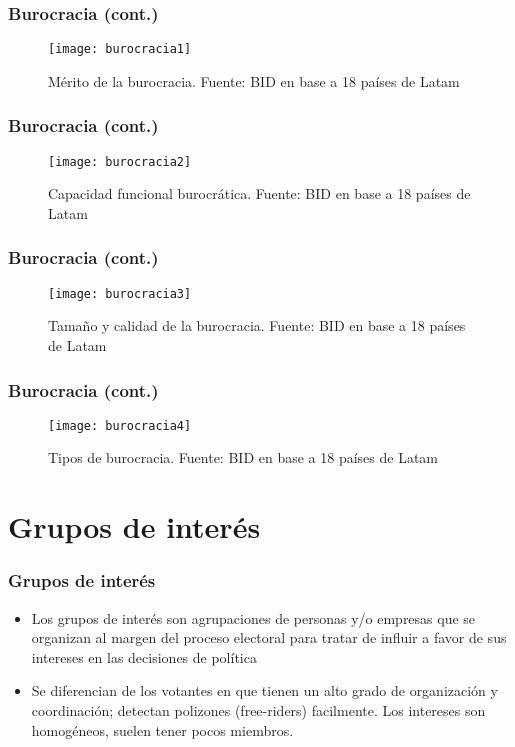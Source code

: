 \documentclass[14pt,aspectratio=169]{beamer}
\begin{document}
\begin{frame}\frametitle{Burocracia (cont.)}
 \begin{figure}[htbp]\vspace{0cm}
    \centering
    \texttt{[image: burocracia1]}
    \caption{Mérito de la burocracia. Fuente: BID en base a 18 países
      de Latam}
    \label{fig:1}
  \end{figure}
        \end{frame}
    


\begin{frame}\frametitle{Burocracia (cont.)}
 \begin{figure}[htbp]\vspace{0cm}
    \centering
    \texttt{[image: burocracia2]}
    \caption{Capacidad funcional burocrática. Fuente: BID en base a 18
    países de Latam}
    \label{fig:1}
  \end{figure}
        \end{frame}




\begin{frame}\frametitle{Burocracia (cont.)}
 \begin{figure}[htbp]\vspace{0cm}
    \centering
    \texttt{[image: burocracia3]}
    \caption{Tamaño y calidad de la burocracia. Fuente: BID en base a 18
    países de Latam}
    \label{fig:1}
  \end{figure}
        \end{frame}



        
\begin{frame}\frametitle{Burocracia (cont.)}
 \begin{figure}[htbp]\vspace{-0.5cm}
    \centering
    \texttt{[image: burocracia4]}
    \caption{Tipos de burocracia. Fuente: BID en base a 18
    países de Latam}
    \label{fig:1}
  \end{figure}
        \end{frame}

        

        

  \section{Grupos de interés}
   
\begin{frame}\frametitle{Grupos de interés}
\begin{itemize}\itemsep 15pt
\item  Los grupos de interés son agrupaciones de personas y/o empresas
  que se organizan al margen del proceso electoral para tratar de
  influir a favor de sus intereses en las decisiones de política
\item Se diferencian de los votantes en que tienen un alto grado de
  organización y coordinación; detectan polizones (free-riders)
  facilmente. Los intereses son homogéneos, suelen tener pocos
  miembros. 
\end{itemize}
\end{frame}
\end{document}
